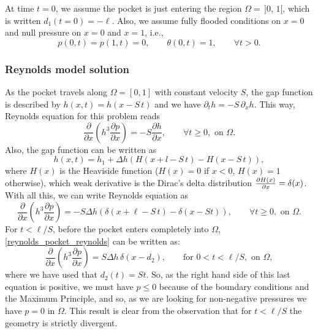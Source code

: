 At time $t=0$, we assume the pocket is just entering the region $\Omega=\,]0,\,1[$, which is written $d_1(t=0)=-\ell$. Also, we assume fully flooded conditions on $x=0$ and null pressure on $x=0$ and $x=1$, i.e.,
\begin{equation}
p(0,t)=p(1,t)=0,\qquad \theta(0,t)=1,\qquad\forall t>0.\label{eq:bound_conditions}
\end{equation}

\subsubsection*{Reynolds model solution}\label{sec:pocket_reynolds}
As the pocket travels along $\Omega=[0,1]$ with constant velocity $S$, the gap function is described by $h(x,t)=h(x-S\,t)$ and we have $\partial_t h=-S\,\partial_x h$. This way, Reynolds equation for this problem reads
\begin{equation*}
\frac{\partial}{\partial x}\left( h^3 \frac{\partial p}{\partial x} \right)=-S\frac{\partial h}{\partial x},\qquad \forall t\geq 0, \text{ on }\Omega.
\end{equation*}
Also, the gap function can be written as
$$h(x,t)=h_1+\Delta h\left(H(x+l-S\,t)-H(x-S\,t)\right),$$
where $H(x)$ is the Heaviside function ($H(x)=0$ if $x<0$, $H(x)=1$ otherwise), which weak derivative is the Dirac's delta distribution $\frac{\partial H(x)}{\partial x}=\delta(x)$. With all this, we can write Reynolds equation as
\begin{equation}
\frac{\partial}{\partial x}\left( h^3 \frac{\partial p}{\partial x} \right)=-S\Delta h\left(\delta(x+\ell-S\,t)-\delta(x-St)\right),\qquad \forall t\geq 0, \text{ on }\Omega.\label{eq:reynolds_pocket_reynolds}
\end{equation}
For $t<\ell/S$, before the pocket enters completely into $\Omega$, \eqref{reynolds_pocket_reynolds} can be written as:
$$\frac{\partial}{\partial x}\left( h^3 \frac{\partial p}{\partial x} \right)=S\Delta h\,\delta(x-d_2),\qquad \text{for } 0<t<\ell/S, \text{ on }\Omega,$$
where we have used that $d_2(t)=St$. So, as the right hand side of this last equation is positive, we must have $p\leq 0$ because of the boundary conditions and the Maximum Principle, and so, as we are looking for non-negative pressures we have $p=0$ in $\Omega$. This result is clear from the observation that for $t<\ell/S$ the geometry is strictly divergent.

